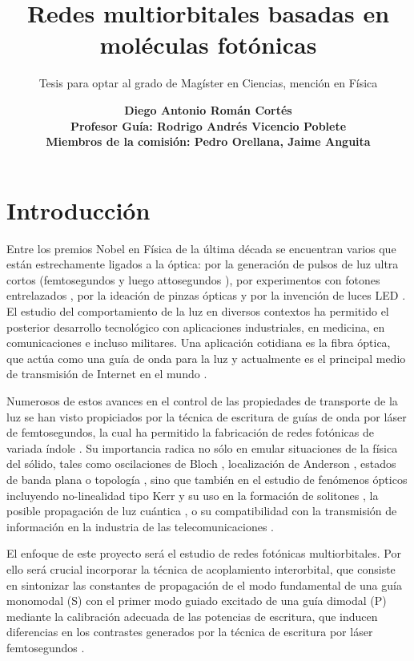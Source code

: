 \documentclass{article}
\date{\textbf{Diego Antonio Román Cortés\\ Profesor Guía: Rodrigo Andrés Vicencio Poblete \\ Miembros de la comisión: Pedro Orellana, Jaime Anguita}}
\author{Tesis para optar al grado de Magíster en Ciencias, mención en Física}
\title{Redes multiorbitales basadas en moléculas fotónicas}
\begin{document}
 \maketitle

\section{Introducción}

Entre los premios Nobel en Física de la última década \cite{nobel} se encuentran varios que están estrechamente ligados a la óptica: por la generación de pulsos de luz ultra cortos (femtosegundos \cite{femto1} y luego attosegundos \cite{atto1, atto2, atto3}), por experimentos con fotones entrelazados \cite{photons1, photons2, photons3}, por la ideación de pinzas ópticas \cite{opticaltweezers} y por la invención de luces LED \cite{led1, led2, led3}. El estudio del comportamiento de la luz en diversos contextos ha permitido el posterior desarrollo tecnológico con aplicaciones industriales, en medicina, en comunicaciones e incluso militares. Una aplicación cotidiana es la fibra óptica, que actúa como una guía de onda para la luz y actualmente es el principal medio de transmisión de Internet en el mundo \cite{fibra2, fibra}. 
	
	Numerosos de estos avances en el control de las propiedades de transporte de la luz se han visto propiciados por la técnica de escritura de guías de onda por láser de femtosegundos, la cual ha permitido la fabricación de redes fotónicas de variada índole \cite{femto, bics, lieb1, lieb2, artificialFB, FBdynamics, strain, dendritas, splitters}. Su importancia radica no sólo en emular situaciones de la física del sólido, tales como oscilaciones de Bloch \cite{BlochOsci}, localización de Anderson \cite{Anderson}, estados de banda plana \cite{lieb1, lieb2, artificialFB, FBdynamics} o topología \cite{obstopo, obsfloquet, topo1dphoto,toporusos}, sino que también en el estudio de fenómenos ópticos incluyendo no-linealidad tipo Kerr y su uso en la formación de solitones \cite{discretesolitons}, la posible propagación de luz cuántica \cite{qed, squeezed, topoquantum}, o su compatibilidad con la transmisión de información en la industria de las telecomunicaciones \cite{telecom}.
	
	El enfoque de este proyecto será el estudio de redes fotónicas multiorbitales. Por ello será crucial incorporar la técnica de acoplamiento interorbital, que consiste en sintonizar las constantes de propagación de el modo fundamental de una guía monomodal (S) con el primer modo guiado excitado de una guía dimodal (P) mediante la calibración adecuada de las potencias de escritura, que inducen diferencias en los contrastes generados por la técnica de escritura por láser femtosegundos \cite{interorbital}.
	
\end{document}
